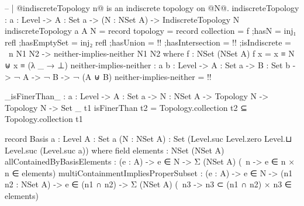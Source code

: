\begin{code}
-- | @indiscreteTopology n@ is an indiscrete topology on @N@.
indiscreteTopology : {a : Level} ->
                     {A : Set a} ->
                     (N : NSet A) ->
                     IndiscreteTopology N
indiscreteTopology {a} {A} N = record
  {topology = record
     {collection = f
     ;hasN = inj₁ refl
     ;hasEmptySet = inj₂ refl
     ;hasUnion = {!!}
     ;hasIntersection = {!!}
     }
  ;isIndiscrete = \ n N1 N2 -> neither-implies-neither N1 N2}
  where
  f : NSet (NSet A)
  f x = x ≡ N ⊎ x ≡ (λ _ → ⊥)
  neither-implies-neither :
    {a b : Level} ->
    {A : Set a} ->
    {B : Set b} ->
    ¬ A ->
    ¬ B ->
    ¬ (A ⊎ B)
  neither-implies-neither = {!!}
  
_isFinerThan_ : {a : Level} ->
                {A : Set a} ->
                {N : NSet A} ->
                Topology N ->
                Topology N ->
                Set _
t1 isFinerThan t2 = Topology.collection t2 ⊆ Topology.collection t1

record Basis {a : Level}
             {A : Set a}
             (N : NSet A) : Set (Level.suc Level.zero Level.⊔ Level.suc (Level.suc a)) where
  field
   elements : NSet (NSet A)
   allContainedByBasisElements :
     (e : A) ->
     e ∈ N ->
     Σ (NSet A) (\ n -> e ∈ n × n ∈ elements)
   multiContainmentImpliesProperSubset :
     (e : A) ->
     e ∈ N ->
     (n1 n2 : NSet A) ->
     e ∈ (n1 ∩ n2) ->
     Σ (NSet A) (\ n3 -> n3 ⊂ (n1 ∩ n2) × n3 ∈ elements)
\end{code}
